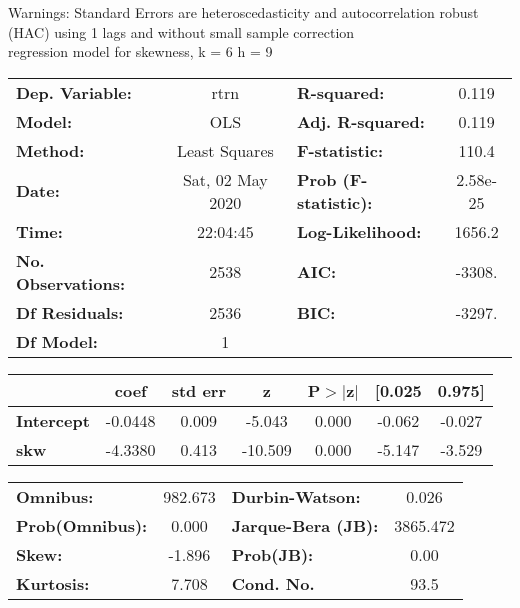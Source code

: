 Warnings: \newline
 [1] Standard Errors are heteroscedasticity and autocorrelation robust (HAC) using 1 lags and without small sample correction\\ 

regression model for skewness, k = 6 h = 9\begin{center}
\begin{tabular}{lclc}
\toprule
\textbf{Dep. Variable:}    &       rtrn       & \textbf{  R-squared:         } &     0.119   \\
\textbf{Model:}            &       OLS        & \textbf{  Adj. R-squared:    } &     0.119   \\
\textbf{Method:}           &  Least Squares   & \textbf{  F-statistic:       } &     110.4   \\
\textbf{Date:}             & Sat, 02 May 2020 & \textbf{  Prob (F-statistic):} &  2.58e-25   \\
\textbf{Time:}             &     22:04:45     & \textbf{  Log-Likelihood:    } &    1656.2   \\
\textbf{No. Observations:} &        2538      & \textbf{  AIC:               } &    -3308.   \\
\textbf{Df Residuals:}     &        2536      & \textbf{  BIC:               } &    -3297.   \\
\textbf{Df Model:}         &           1      & \textbf{                     } &             \\
\bottomrule
\end{tabular}
\begin{tabular}{lcccccc}
                   & \textbf{coef} & \textbf{std err} & \textbf{z} & \textbf{P$> |$z$|$} & \textbf{[0.025} & \textbf{0.975]}  \\
\midrule
\textbf{Intercept} &      -0.0448  &        0.009     &    -5.043  &         0.000        &       -0.062    &       -0.027     \\
\textbf{skw}       &      -4.3380  &        0.413     &   -10.509  &         0.000        &       -5.147    &       -3.529     \\
\bottomrule
\end{tabular}
\begin{tabular}{lclc}
\textbf{Omnibus:}       & 982.673 & \textbf{  Durbin-Watson:     } &    0.026  \\
\textbf{Prob(Omnibus):} &   0.000 & \textbf{  Jarque-Bera (JB):  } & 3865.472  \\
\textbf{Skew:}          &  -1.896 & \textbf{  Prob(JB):          } &     0.00  \\
\textbf{Kurtosis:}      &   7.708 & \textbf{  Cond. No.          } &     93.5  \\
\bottomrule
\end{tabular}
\end{center}

